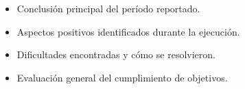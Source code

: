 \documentclass[12pt, a4paper, oneside]{article}
\newcommand{\ColorPrincipal}{AzulITM}
\begin{document}
\begin{itemize}[label={\color{\ColorPrincipal}>}, leftmargin=1.5em]
  \item Conclusión principal del período reportado.
  \item Aspectos positivos identificados durante la ejecución.
  \item Dificultades encontradas y cómo se resolvieron.
  \item Evaluación general del cumplimiento de objetivos.
\end{itemize}

%

%
\end{document}
